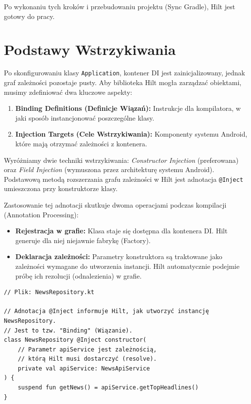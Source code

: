 Po wykonaniu tych kroków i przebudowaniu projektu (Sync Gradle), Hilt jest gotowy do pracy.

\section{Podstawy Wstrzykiwania}

Po skonfigurowaniu klasy \texttt{Application}, kontener DI jest zainicjalizowany, jednak graf zależności pozostaje pusty. Aby biblioteka Hilt mogła zarządzać obiektami, musimy zdefiniować dwa kluczowe aspekty:
\begin{enumerate}
    \item \textbf{Binding Definitions (Definicje Wiązań):} Instrukcje dla kompilatora, w jaki sposób instancjonować poszczególne klasy.
    \item \textbf{Injection Targets (Cele Wstrzykiwania):} Komponenty systemu Android, które mają otrzymać zależności z kontenera.
\end{enumerate}

Wyróżniamy dwie techniki wstrzykiwania: \textit{Constructor Injection} (preferowana) oraz \textit{Field Injection} (wymuszona przez architekturę systemu Android). Podstawową metodą rozszerzania grafu zależności w Hilt jest adnotacja \texttt{@Inject} umieszczona przy konstruktorze klasy.

Zastosowanie tej adnotacji skutkuje dwoma operacjami podczas kompilacji (Annotation Processing):
\begin{itemize}
    \item \textbf{Rejestracja w grafie:} Klasa staje się dostępna dla kontenera DI. Hilt generuje dla niej niejawnie fabrykę (Factory).
    \item \textbf{Deklaracja zależności:} Parametry konstruktora są traktowane jako zależności wymagane do utworzenia instancji. Hilt automatycznie podejmie próbę ich rezolucji (odnalezienia) w grafie.
\end{itemize}

\begin{verbatim}
// Plik: NewsRepository.kt

// Adnotacja @Inject informuje Hilt, jak utworzyć instancję NewsRepository.
// Jest to tzw. "Binding" (Wiązanie).
class NewsRepository @Inject constructor(
    // Parametr apiService jest zależnością, 
    // którą Hilt musi dostarczyć (resolve).
    private val apiService: NewsApiService 
) {
    suspend fun getNews() = apiService.getTopHeadlines()
}
\end{verbatim}

